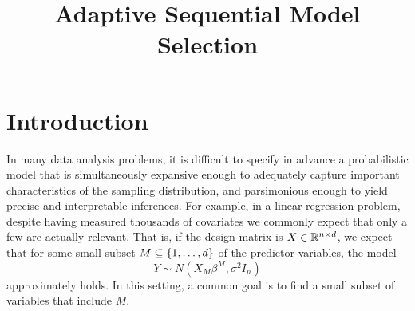 \documentclass{article}
\begin{document}
\newtheorem{theorem}{Theorem}
\newtheorem{corollary}[theorem]{Corollary}
\newtheorem{lemma}[theorem]{Lemma}
\newtheorem{observation}[theorem]{Observation}
\newtheorem{proposition}[theorem]{Proposition}
\newtheorem{definition}[theorem]{Definition}
\newtheorem{claim}[theorem]{Claim}
\newtheorem{fact}[theorem]{Fact}
\newtheorem{assumption}[theorem]{Assumption}
\newtheorem{model}[theorem]{Model}

\theoremstyle{definition}
\newtheorem{example}{Example}

\newcommand{\cM}{\mathcal{M}}
\newcommand{\cH}{\mathcal{H}}
\newcommand{\cD}{\mathcal{D}}
\newcommand{\FDR}{\textnormal{FDR}}
\newcommand{\FCR}{\textnormal{FCR}}
\newcommand{\crt}{\phi}
\newcommand{\M}{\mathcal{M}}
\newcommand{\cY}{\mathcal{Y}}
\newcommand{\cX}{\mathcal{X}}
\newcommand{\cV}{\mathcal{V}}
\newcommand{\bX}{\mathbf{X}}
\newcommand{\x}{\mathbf{x}}
\newcommand{\Gv}{\;\;\big|\;\;}
\newcommand{\proj}{\cP}
\newcommand{\pow}{\text{Pow}}
\newcommand{\sF}{\mathscr{F}}
\newcommand{\cF}{\mathcal{F}}
\newcommand{\sC}{\mathscr{C}}
\newcommand{\hJ}{\widehat{J}}
\newcommand{\bH}{\mathbf{H}}
\newcommand{\bM}{\mathbf{M}}
\newcommand{\hK}{\widehat{K}}
\newcommand{\leqAS}{\overset{\textrm{a.s.}}{\leq}}


\newcommand*\mystrut{\vrule width0pt height0pt depth1.5ex\relax}
\newcommand{\underlabel}{\underbracket[1pt][.5pt]{\mystrut \quad\;\; \sub \quad\;\; }}
\newcommand{\JTcomment}[1]{{\color{blue}{(JT: \bf \sc #1) }}}
\newcommand{\WFcomment}[1]{{\color{red}{(WF: \bf \sc #1) }}}

\title{Adaptive Sequential Model Selection}
\maketitle

\begin{abstract}
  
\end{abstract}



\section{Introduction}

In many data analysis problems, it is difficult to specify in advance a probabilistic model that is simultaneously expansive enough to adequately capture important characteristics of the sampling distribution, and parsimonious enough to yield precise and interpretable inferences. For example, in a linear regression problem, despite having measured thousands of covariates we commonly expect that only a few are actually relevant. That is, if the design matrix is $X\in \mathbb{R}^{n\times d}$, we expect that for some small subset $M\subseteq \{1,\ldots,d\}$ of the predictor variables, the model
\begin{equation}
  Y \sim N(X_M\beta^M, \sigma^2I_n)
\end{equation}
approximately holds. In this setting, a common goal is to find a small subset of variables that include $M$.
\end{document}
